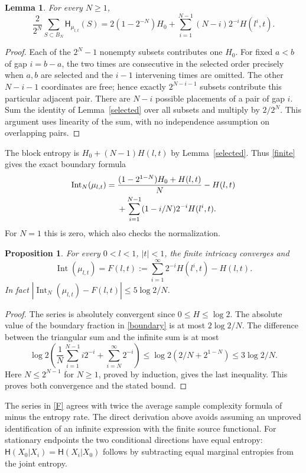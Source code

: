 \documentclass[11pt]{article}
\newtheorem{lemma}[theorem]{Lemma}
\newtheorem{proposition}[theorem]{Proposition}
\newcommand{\HH}{\mathsf H}
\newcommand{\Int}{\operatorname{Int}}
\begin{document}
\begin{lemma}\label{average}
For every $N\geq1$,
\begin{equation}
 \frac{2}{2^N}\sum_{S\subset B_N}\HH_{\mu_{l,t}}(S)
 =2(1-2^{-N})H_0+\sum_{i=1}^{N-1}(N-i)2^{-i}H(l^i,t).\label{count}
\end{equation}
\end{lemma}
\begin{proof}
Each of the $2^N-1$ nonempty subsets contributes one $H_0$. For fixed $a<b$ of gap $i=b-a$, the two times are consecutive in the selected order precisely when $a,b$ are selected and the $i-1$ intervening times are omitted. The other $N-i-1$ coordinates are free; hence exactly $2^{N-i-1}$ subsets contribute this particular adjacent pair. There are $N-i$ possible placements of a pair of gap $i$. Sum the identity of Lemma~\ref{selected} over all subsets and multiply by $2/2^N$. This argument uses linearity of the sum, with no independence assumption on overlapping pairs.
\end{proof}
The block entropy is $H_0+(N-1)H(l,t)$ by Lemma~\ref{selected}. Thus \eqref{finite} gives the exact boundary formula
\begin{align}
 \Int_N(\mu_{l,t})={}&\frac{(1-2^{1-N})H_0+H(l,t)}N-H(l,t)\notag\\
 &+\sum_{i=1}^{N-1}(1-i/N)2^{-i}H(l^i,t).\label{boundary}
\end{align}
For $N=1$ this is zero, which also checks the normalization.

\begin{proposition}\label{series}
For every $0<l<1$, $|t|<1$, the finite intricacy converges and
\begin{equation}
 \Int(\mu_{l,t})=F(l,t):=\sum_{i=1}^\infty2^{-i}H(l^i,t)-H(l,t).\label{F}
\end{equation}
In fact $|\Int_N(\mu_{l,t})-F(l,t)|\leq5\log2/N$.
\end{proposition}
\begin{proof}
The series is absolutely convergent since $0\leq H\leq\log2$. The absolute value of the boundary fraction in \eqref{boundary} is at most $2\log2/N$. The difference between the triangular sum and the infinite sum is at most
\[
 \log2\left(\frac1N\sum_{i=1}^{N-1}i2^{-i}
                  +\sum_{i=N}^{\infty}2^{-i}\right)
 \leq\log2\left(2/N+2^{1-N}\right)\leq3\log2/N.
\]
Here $N\leq2^{N-1}$ for $N\geq1$, proved by induction, gives the last inequality. This proves both convergence and the stated bound.
\end{proof}
The series in \eqref{F} agrees with twice the average sample complexity formula of \cite[Proposition 5.10]{PW} minus the entropy rate. The direct derivation above avoids assuming an unproved identification of an infinite expression with the finite source functional. For stationary endpoints the two conditional directions have equal entropy: $\HH(X_0|X_i)=\HH(X_i|X_0)$ follows by subtracting equal marginal entropies from the joint entropy.
\end{document}
